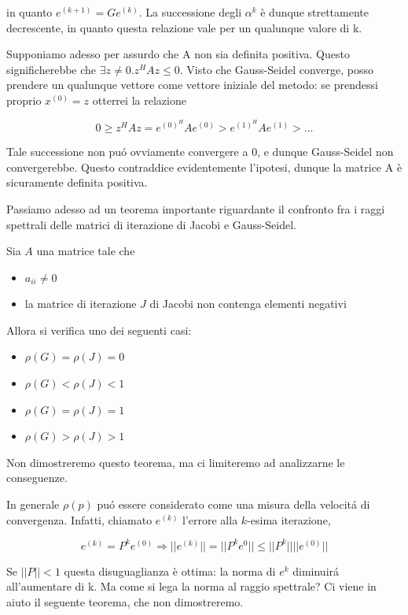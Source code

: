\begin{thproof}
\begin{description}
in quanto $ e^{(k+1)} = G e^{(k)} $. La successione degli $ \alpha^{k} $ \`e dunque strettamente decrescente, in quanto questa relazione vale per un qualunque valore di k.

Supponiamo adesso per assurdo che A non sia definita positiva. Questo significherebbe che $ \exists z \neq 0.z^HAz \leq 0 $. Visto che Gauss-Seidel converge, posso prendere un qualunque vettore come vettore iniziale del metodo: se prendessi proprio $ x^{(0)} = z $ otterrei la relazione

\[ 0 \geq z^HAz = e^{(0)^{H}} A e^{(0)} > e^{(1)^{H}} A e^{(1)} > \ldots \]

Tale successione non pu\'o ovviamente convergere a 0, e dunque Gauss-Seidel non convergerebbe. Questo contraddice evidentemente l'ipotesi, dunque la matrice A \`e sicuramente definita positiva.
\end{description}
\end{thproof}


Passiamo adesso ad un teorema importante riguardante il confronto fra i raggi spettrali delle matrici di iterazione di Jacobi e Gauss-Seidel.

\begin{theo}
Sia $A$ una matrice tale che 
\begin{itemize}
\item $a_{ii} \neq 0 $
\item la matrice di iterazione $J$ di Jacobi non contenga elementi negativi
\end{itemize}
Allora si verifica uno dei seguenti casi:
\begin{itemize}
 \item $\rho(G) = \rho(J) = 0$
 \item $\rho(G) < \rho(J) < 1$
 \item $\rho(G) = \rho(J) = 1$
 \item $\rho(G) > \rho(J) > 1$
\end{itemize}
\end{theo}

Non dimostreremo questo teorema, ma ci limiteremo ad analizzarne le conseguenze.

In generale $\rho(p)$ pu\'o essere considerato come una misura della velocit\'a di convergenza. Infatti, chiamato $e^{(k)}$ l'errore alla $k$-esima iterazione, 

$$ e^{(k)} = P^{k} e^{(0)} \Rightarrow || e^{(k)} || = || P^k e^0 || \leq || P^{k} || ||e^{(0)}|| $$

Se $ ||P|| < 1 $ questa disuguaglianza \`e ottima: la norma di $ e^k $ diminuir\'a all'aumentare di k. Ma come si lega la norma al raggio spettrale? Ci viene in aiuto il seguente teorema, che non dimostreremo.

